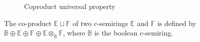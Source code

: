 \begin{figure}[H]
	\centering
	\resizebox{8cm}{!}{}
	\caption{Coproduct universal property}
	\label{coprod}
\end{figure}

\begin{definition}
The co-product $\mathbb{E} \sqcup \mathbb{F}$ of two c-semirings $\mathbb{E}$ and $\mathbb{F}$ is defined by $\mathbb{B} \oplus \mathbb{E} \oplus \mathbb{F} \oplus \mathbb{E} \otimes_{\mathbb{B}}\mathbb{F}$, where $ \mathbb{B}$ is the boolean c-semiring.
\end{definition}